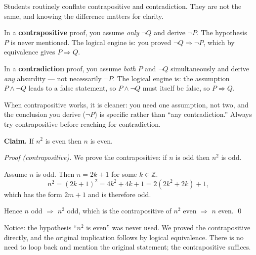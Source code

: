 \begin{remark}
Students routinely conflate contrapositive and contradiction.
They are not the same, and knowing the difference matters for clarity.

In a \textbf{contrapositive} proof, you assume \emph{only} $\neg Q$
and derive $\neg P$. The hypothesis $P$ is never mentioned.
The logical engine is: you proved $\neg Q \Rightarrow \neg P$,
which by equivalence gives $P \Rightarrow Q$.

In a \textbf{contradiction} proof, you assume \emph{both} $P$ and $\neg Q$
simultaneously and derive \emph{any} absurdity --- not necessarily $\neg P$.
The logical engine is: the assumption $P \land \neg Q$ leads to a false
statement, so $P \land \neg Q$ must itself be false, so $P \Rightarrow Q$.

When contrapositive works, it is cleaner: you need one assumption, not two,
and the conclusion you derive ($\neg P$) is specific rather than
``any contradiction.'' Always try contrapositive before reaching
for contradiction.
\end{remark}

\begin{example}
\textbf{Claim.} If $n^2$ is even then $n$ is even.

\medskip
\noindent\textit{Proof (contrapositive).}
We prove the contrapositive: if $n$ is odd then $n^2$ is odd.

Assume $n$ is odd. Then $n = 2k+1$ for some $k \in \mathbb{Z}$.
\[
n^2 = (2k+1)^2 = 4k^2 + 4k + 1 = 2(2k^2+2k)+1,
\]
which has the form $2m + 1$ and is therefore odd.

Hence $n$ odd $\Rightarrow$ $n^2$ odd, which is the contrapositive of
$n^2$ even $\Rightarrow$ $n$ even. \qed

\medskip
\noindent
Notice: the hypothesis ``$n^2$ is even'' was never used. We proved
the contrapositive directly, and the original implication follows
by logical equivalence. There is no need to loop back and mention
the original statement; the contrapositive suffices.
\end{example}
